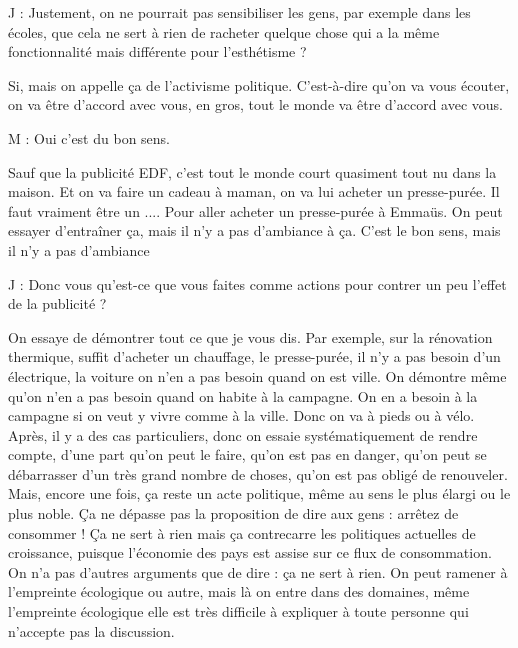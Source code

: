 \begin{description}
\vspace{1\baselineskip}

J : Justement, on ne pourrait pas sensibiliser les gens, par exemple dans les écoles, que cela ne sert à rien de racheter quelque chose qui a la même fonctionnalité mais différente pour l'esthétisme ?

\vspace{1\baselineskip}

Si, mais on appelle ça de l'activisme politique. C'est-à-dire qu’on va vous écouter, on va être d'accord avec vous, en gros, tout le monde va être d'accord avec vous. 

\vspace{1\baselineskip}

M : Oui c'est du bon sens.

\vspace{1\baselineskip}

Sauf que la publicité EDF, c'est tout le monde court quasiment tout nu dans la maison. Et on va faire un cadeau à maman, on va lui acheter un presse-purée. Il faut vraiment être un .... Pour aller acheter un presse-purée à Emmaüs. On peut essayer d’entraîner ça, mais il n'y a pas d'ambiance à ça. C'est le bon sens, mais il n'y a pas d'ambiance

\vspace{1\baselineskip}

J : Donc vous qu'est-ce que vous faites comme actions pour contrer un peu l'effet de la publicité ?

\vspace{1\baselineskip}

On essaye de démontrer tout ce que je vous dis. Par exemple, sur la rénovation thermique, suffit d'acheter un chauffage, le presse-purée, il n'y a pas besoin d'un électrique, la voiture on n'en a pas besoin quand on est ville. On démontre même qu’on n’en a pas besoin quand on habite à la campagne.  On en a besoin à la campagne si on veut y vivre comme à la ville. Donc on va à pieds ou à vélo. Après, il y a des cas particuliers, donc on essaie systématiquement de rendre compte, d'une part qu'on peut le faire, qu'on est pas en danger, qu'on peut se débarrasser d'un très grand nombre de choses, qu'on est pas obligé de renouveler. Mais, encore une fois, ça reste un acte politique, même au sens le plus élargi ou le plus noble. Ça ne dépasse pas la proposition de dire aux gens : arrêtez de consommer ! Ça ne sert à rien mais ça contrecarre les politiques actuelles de croissance, puisque l'économie des pays est assise sur ce flux de consommation. On n’a pas d'autres arguments que de dire : ça ne sert à rien. On peut ramener à l'empreinte écologique ou autre, mais là on entre dans des domaines, même l'empreinte écologique elle est très difficile à expliquer à toute personne qui n'accepte pas la discussion.


\end{description}

